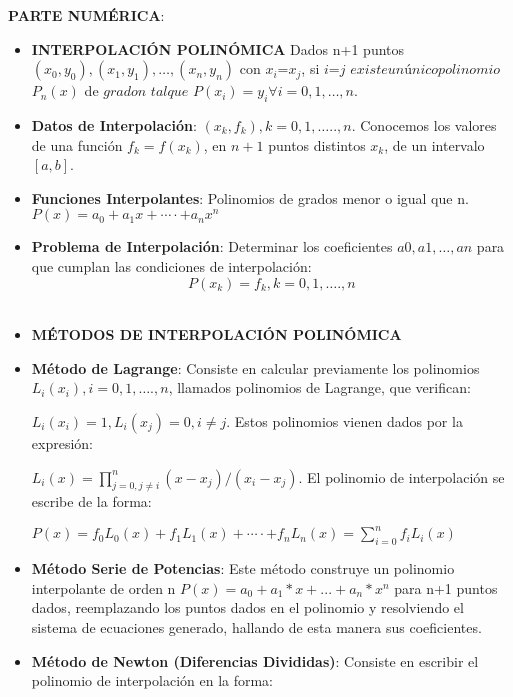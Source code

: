 \documentclass[10pt,a4paper]{article}
\begin{document}
\begin{multicols}{2}
\begin{itemize}
\end{itemize}
\noindent \textbf{PARTE NUMÉRICA}:	
\begin{itemize}
	\item \textbf{INTERPOLACIÓN POLINÓMICA}
	Dados n+1 puntos $(x_0,y_0), (x_1,y_1), … , (x_n,y_n)$ con $x_i$\not=$x_j$, si $i$\not=$j$ $ existe un único polinomio $ $P_n (x)$ de $grado $\leq$ n$ $ tal que $ $P(x_i )=y_i  \forall i=0,1,…,n.$
	\item \textbf{Datos de Interpolación}: 
	${(x_k,f_k )} $$, k=0,1,…..,n$.
	Conocemos los valores de una función $f_k=f(x_k)$, en $n+1$ puntos distintos $x_k$, de un intervalo $[a,b]$.
	
	\item \textbf{Funciones Interpolantes}: Polinomios de grados menor o igual que n.
	$P(x)=a_0+a_1 x+⋯⋅+a_n x^n$

	\item \textbf{Problema de Interpolación}: Determinar los coeficientes $a0, a1,…, an$ para que cumplan las condiciones de interpolación: \[P(x_k )= f_k,k=0,1,….,n\]\\

	\item \textbf{MÉTODOS DE INTERPOLACIÓN POLINÓMICA}

	\item \textbf{Método de Lagrange}:
	Consiste en calcular previamente los polinomios  $L_i (x_i ),i=0,1,….,n$, llamados polinomios de Lagrange, que verifican:

	$L_i (x_i )=1,L_i (x_j )=0,i\not=j$.
	Estos polinomios vienen dados por la expresión:

	$L_i (x)=\prod_{j=0,j\not=i}^{n}(x-x_j)/(x_i-x_j )$.
	El polinomio de interpolación se escribe de la forma:
	
	$P(x)=f_0 L_0 (x)+f_1 L_1 (x)+⋯⋅+f_n L_n (x)=\sum_{i=0}^{n}f_i L_i (x)$
	
	\item \textbf{Método Serie de Potencias}:
	Este método construye un polinomio interpolante de orden n $P(x)=a_0+a_1*x+...+a_n*x^n $ para n+1 puntos dados, reemplazando los puntos dados en el polinomio y resolviendo el sistema de ecuaciones generado, hallando de esta manera sus coeficientes.
	
	\item \textbf{Método de Newton (Diferencias Divididas)}:
	Consiste en escribir el polinomio de interpolación en la forma:
	

\end{itemize}
\end{multicols}
\end{document}
